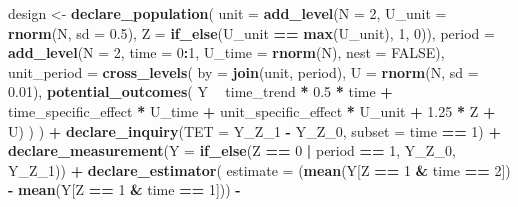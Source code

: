 \documentclass[
]{article}
\newenvironment{Shaded}{\begin{snugshade}}{\end{snugshade}}
\newcommand{\DataTypeTok}[1]{\textcolor[rgb]{0.13,0.29,0.53}{#1}}
\newcommand{\DecValTok}[1]{\textcolor[rgb]{0.00,0.00,0.81}{#1}}
\newcommand{\FloatTok}[1]{\textcolor[rgb]{0.00,0.00,0.81}{#1}}
\newcommand{\KeywordTok}[1]{\textcolor[rgb]{0.13,0.29,0.53}{\textbf{#1}}}
\newcommand{\NormalTok}[1]{#1}
\newcommand{\OperatorTok}[1]{\textcolor[rgb]{0.81,0.36,0.00}{\textbf{#1}}}
\newcommand{\OtherTok}[1]{\textcolor[rgb]{0.56,0.35,0.01}{#1}}
\newcommand{\StringTok}[1]{\textcolor[rgb]{0.31,0.60,0.02}{#1}}
\begin{document}
\begin{Shaded}
\begin{Highlighting}[]
\NormalTok{design <-}\StringTok{ }
\StringTok{  }\KeywordTok{declare_population}\NormalTok{(}
    \DataTypeTok{unit =} \KeywordTok{add_level}\NormalTok{(}\DataTypeTok{N =} \DecValTok{2}\NormalTok{, }\DataTypeTok{U_unit =} \KeywordTok{rnorm}\NormalTok{(N, }\DataTypeTok{sd =} \FloatTok{0.5}\NormalTok{), }\DataTypeTok{Z =} \KeywordTok{if_else}\NormalTok{(U_unit }\OperatorTok{==}\StringTok{ }\KeywordTok{max}\NormalTok{(U_unit), }\DecValTok{1}\NormalTok{, }\DecValTok{0}\NormalTok{)),}
    \DataTypeTok{period =} \KeywordTok{add_level}\NormalTok{(}\DataTypeTok{N =} \DecValTok{2}\NormalTok{, }\DataTypeTok{time =} \DecValTok{0}\OperatorTok{:}\DecValTok{1}\NormalTok{, }\DataTypeTok{U_time =} \KeywordTok{rnorm}\NormalTok{(N), }\DataTypeTok{nest =} \OtherTok{FALSE}\NormalTok{),}
    \DataTypeTok{unit_period =} \KeywordTok{cross_levels}\NormalTok{(}
      \DataTypeTok{by =} \KeywordTok{join}\NormalTok{(unit, period), }
      \DataTypeTok{U =} \KeywordTok{rnorm}\NormalTok{(N, }\DataTypeTok{sd =} \FloatTok{0.01}\NormalTok{),}
      \KeywordTok{potential_outcomes}\NormalTok{(}
\NormalTok{        Y }\OperatorTok{~}\StringTok{ }\NormalTok{time_trend }\OperatorTok{*}\StringTok{ }\FloatTok{0.5} \OperatorTok{*}\StringTok{ }\NormalTok{time }\OperatorTok{+}\StringTok{ }
\StringTok{          }\NormalTok{time_specific_effect }\OperatorTok{*}\StringTok{ }\NormalTok{U_time }\OperatorTok{+}\StringTok{ }
\StringTok{          }\NormalTok{unit_specific_effect }\OperatorTok{*}\StringTok{ }\NormalTok{U_unit }\OperatorTok{+}\StringTok{ }
\StringTok{          }\FloatTok{1.25} \OperatorTok{*}\StringTok{ }\NormalTok{Z }\OperatorTok{+}\StringTok{ }\NormalTok{U)}
\NormalTok{    )}
\NormalTok{  ) }\OperatorTok{+}\StringTok{ }
\StringTok{  }\KeywordTok{declare_inquiry}\NormalTok{(}\DataTypeTok{TET =}\NormalTok{ Y_Z_}\DecValTok{1} \OperatorTok{-}\StringTok{ }\NormalTok{Y_Z_}\DecValTok{0}\NormalTok{, }\DataTypeTok{subset =}\NormalTok{ time }\OperatorTok{==}\StringTok{ }\DecValTok{1}\NormalTok{) }\OperatorTok{+}\StringTok{ }
\StringTok{  }\KeywordTok{declare_measurement}\NormalTok{(}\DataTypeTok{Y =} \KeywordTok{if_else}\NormalTok{(Z }\OperatorTok{==}\StringTok{ }\DecValTok{0} \OperatorTok{|}\StringTok{ }\NormalTok{period }\OperatorTok{==}\StringTok{ }\DecValTok{1}\NormalTok{, Y_Z_}\DecValTok{0}\NormalTok{, Y_Z_}\DecValTok{1}\NormalTok{)) }\OperatorTok{+}\StringTok{ }
\StringTok{  }\KeywordTok{declare_estimator}\NormalTok{(}
    \DataTypeTok{estimate =} 
\NormalTok{      (}\KeywordTok{mean}\NormalTok{(Y[Z }\OperatorTok{==}\StringTok{ }\DecValTok{1} \OperatorTok{&}\StringTok{ }\NormalTok{time }\OperatorTok{==}\StringTok{ }\DecValTok{2}\NormalTok{]) }\OperatorTok{-}\StringTok{ }\KeywordTok{mean}\NormalTok{(Y[Z }\OperatorTok{==}\StringTok{ }\DecValTok{1} \OperatorTok{&}\StringTok{ }\NormalTok{time }\OperatorTok{==}\StringTok{ }\DecValTok{1}\NormalTok{])) }\OperatorTok{-}\StringTok{ }

\end{Highlighting}
\end{Shaded}
\end{document}
